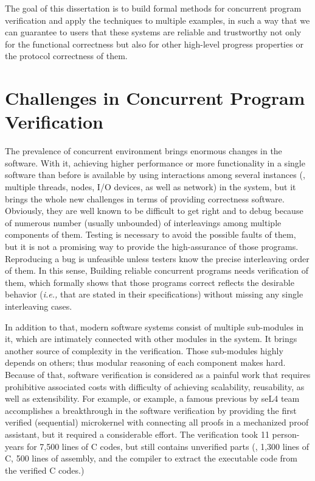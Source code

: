 The goal of this dissertation is to build formal methods for concurrent program verification and apply the techniques to multiple examples,
in such a way that we can guarantee to users that these systems are reliable and trustworthy not only for the functional correctness but also for other high-level progress properties or the protocol correctness of them. 


\section{Challenges in Concurrent Program Verification}
\label{chapter:introduction:sec:challenges-in-concurrent-program-verification}

The prevalence of concurrent environment brings enormous changes in the software. 
With it, achieving higher performance or more functionality in a single software than before is available by
using interactions among several instances (\ie, multiple threads, nodes, I/O devices,
as well as network) in the system,
but it brings the whole new challenges in terms of providing correctness software. 
Obviously, they are well known to be difficult to get right and to debug because of
numerous number (usually unbounded) of interleavings among multiple components of them.
Testing is necessary to avoid the possible faults of them,
but it is not a promising way to provide the high-assurance of those programs. 
Reproducing a bug is unfeasible unless testers know the precise interleaving order of them. 
In this sense, 
Building reliable concurrent programs 
needs verification of them, which formally shows that those programs correct reflects the 
desirable behavior (\textit{i.e.,} that are stated in their specifications) 
without missing any single interleaving cases. 


In addition to that, 
modern software systems consist of multiple sub-modules in it, which are intimately connected with other modules in the system. 
It brings another source of complexity in the verification. 
Those sub-modules highly depends on others;
thus modular reasoning of each component makes hard.
Because of that, 
software verification is considered as a painful work that requires prohibitive associated costs with difficulty of 
achieving scalability, reusability, as well as extensibility.
For example, 
or example, a famous previous by seL4 team~\cite{klein2009sel4} accomplishes
a breakthrough in the software verification 
by providing the first verified (sequential) microkernel with connecting all proofs in  
 a  mechanized proof assistant, 
 but it required a considerable effort. 
The verification took 11 person-years for 7,500 lines of C codes, but still contains unverified parts (\ie, 1,300 lines of C, 500 lines of assembly, and the compiler
to extract the executable code from the verified C codes.)



